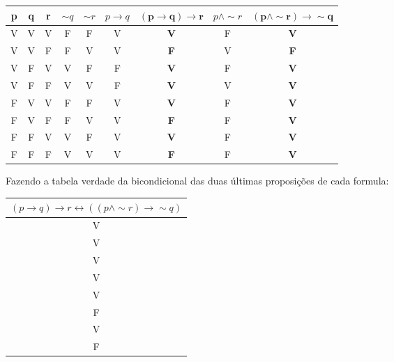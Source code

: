 \documentclass[12pt, a4paper,final]{article}
\begin{document}
\begin{enumerate}
\begin{enumerate}[label=(\alph*)]
\begin{minipage}[t]{\textwidth}
                    \begin{tabular}{|c|c|c|c|c|c|>{\bfseries}c||c| >{\bfseries}c|}
                        \hline
                        p & q & r & $\sim q$ & $\sim r$ & $p \rightarrow q$ & $\boldsymbol{(p \rightarrow q) \rightarrow r}$ & $p \wedge \sim r$ & $\boldsymbol{(p \wedge \sim r) \rightarrow \sim q}$ \\
                        \hline
                        V & V & V & F & F & V & V & F & V \\
                        V & V & F & F & V & V & F & V & F \\
                        V & F & V & V & F & F & V & F & V \\
                        V & F & F & V & V & F & V & V & V \\
                        F & V & V & F & F & V & V & F & V \\
                        F & V & F & F & V & V & F & F & V \\
                        F & F & V & V & F & V & V & F & V \\
                        F & F & F & V & V & V & F & F & V \\
                        \hline
                    \end{tabular}
                    
                    \vskip 5mm
                    
                    Fazendo a tabela verdade da bicondicional das duas últimas proposições de cada formula:
                    
                    \vskip 5mm
                    
                    \begin{tabular}{|c|}
                        \hline
                        $(p \rightarrow q) \rightarrow r \leftrightarrow ((p\wedge \sim r) \rightarrow \sim q)$\\
                        \hline
                        V \\
                        V \\
                        V \\
                        V \\
                        V \\
                        F \\
                        V \\
                        F \\
                        \hline
                    \end{tabular}
                    

\end{minipage}
\end{enumerate}
\end{enumerate}
\end{document}
